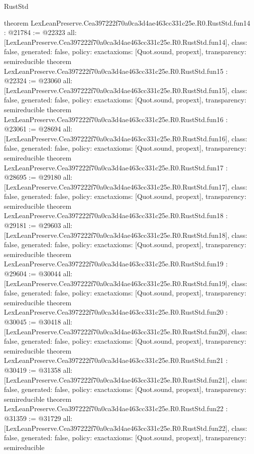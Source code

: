 \begin{lexlean}{RustStd}
\begin{coremodule}
{}
theorem LexLeanPreserve.Cea397222f70a0ca3d4ae463cc331c25e.R0.RustStd.fun14 : @21784 := @22323 {
  all: [LexLeanPreserve.Cea397222f70a0ca3d4ae463cc331c25e.R0.RustStd.fun14],
  class: false,
  generated: false,
  policy: exact{axioms: [Quot.sound, propext]},
  transparency: semireducible
}
theorem LexLeanPreserve.Cea397222f70a0ca3d4ae463cc331c25e.R0.RustStd.fun15 : @22324 := @23060 {
  all: [LexLeanPreserve.Cea397222f70a0ca3d4ae463cc331c25e.R0.RustStd.fun15],
  class: false,
  generated: false,
  policy: exact{axioms: [Quot.sound, propext]},
  transparency: semireducible
}
theorem LexLeanPreserve.Cea397222f70a0ca3d4ae463cc331c25e.R0.RustStd.fun16 : @23061 := @28694 {
  all: [LexLeanPreserve.Cea397222f70a0ca3d4ae463cc331c25e.R0.RustStd.fun16],
  class: false,
  generated: false,
  policy: exact{axioms: [Quot.sound, propext]},
  transparency: semireducible
}
theorem LexLeanPreserve.Cea397222f70a0ca3d4ae463cc331c25e.R0.RustStd.fun17 : @28695 := @29180 {
  all: [LexLeanPreserve.Cea397222f70a0ca3d4ae463cc331c25e.R0.RustStd.fun17],
  class: false,
  generated: false,
  policy: exact{axioms: [Quot.sound, propext]},
  transparency: semireducible
}
theorem LexLeanPreserve.Cea397222f70a0ca3d4ae463cc331c25e.R0.RustStd.fun18 : @29181 := @29603 {
  all: [LexLeanPreserve.Cea397222f70a0ca3d4ae463cc331c25e.R0.RustStd.fun18],
  class: false,
  generated: false,
  policy: exact{axioms: [Quot.sound, propext]},
  transparency: semireducible
}
theorem LexLeanPreserve.Cea397222f70a0ca3d4ae463cc331c25e.R0.RustStd.fun19 : @29604 := @30044 {
  all: [LexLeanPreserve.Cea397222f70a0ca3d4ae463cc331c25e.R0.RustStd.fun19],
  class: false,
  generated: false,
  policy: exact{axioms: [Quot.sound, propext]},
  transparency: semireducible
}
theorem LexLeanPreserve.Cea397222f70a0ca3d4ae463cc331c25e.R0.RustStd.fun20 : @30045 := @30418 {
  all: [LexLeanPreserve.Cea397222f70a0ca3d4ae463cc331c25e.R0.RustStd.fun20],
  class: false,
  generated: false,
  policy: exact{axioms: [Quot.sound, propext]},
  transparency: semireducible
}
theorem LexLeanPreserve.Cea397222f70a0ca3d4ae463cc331c25e.R0.RustStd.fun21 : @30419 := @31358 {
  all: [LexLeanPreserve.Cea397222f70a0ca3d4ae463cc331c25e.R0.RustStd.fun21],
  class: false,
  generated: false,
  policy: exact{axioms: [Quot.sound, propext]},
  transparency: semireducible
}
theorem LexLeanPreserve.Cea397222f70a0ca3d4ae463cc331c25e.R0.RustStd.fun22 : @31359 := @31729 {
  all: [LexLeanPreserve.Cea397222f70a0ca3d4ae463cc331c25e.R0.RustStd.fun22],
  class: false,
  generated: false,
  policy: exact{axioms: [Quot.sound, propext]},
  transparency: semireducible
}
\end{coremodule}
\end{lexlean}
